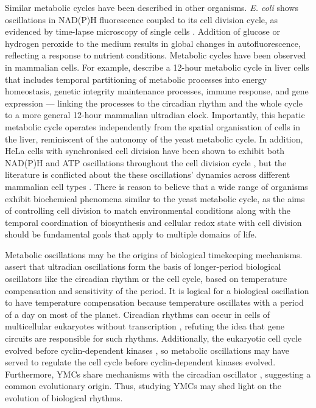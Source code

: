 Similar metabolic cycles have been described in other organisms.
\emph{E. coli} shows oscillations in NAD(P)H fluorescence coupled to its cell division cycle, as evidenced by time-lapse microscopy of single cells \parencite{zhangDynamicSinglecellNAD2018}.
Addition of glucose or hydrogen peroxide to the medium results in global changes in autofluorescence, reflecting a response to nutrient conditions.
Metabolic cycles have been observed in mammalian cells.
For example, \textcite{zhuLogicTemporalCompartmentalization2022} describe a 12-hour metabolic cycle in liver cells that includes temporal partitioning of metabolic processes into energy homeostasis, genetic integrity maintenance processes, immune response, and gene expression --- linking the processes to the circadian rhythm and the whole cycle to a more general 12-hour mammalian ultradian clock.
Importantly, this hepatic metabolic cycle operates independently from the spatial organisation of cells in the liver, reminiscent of the autonomy of the yeast metabolic cycle.
In addition, HeLa cells with synchronised cell division have been shown to exhibit both NAD(P)H and ATP oscillations throughout the cell division cycle \parencite{ahnTemporalFluxomicsReveals2017}, but the literature is conflicted about the these oscillations' dynamics across different mammalian cell types \parencite{zylstraMetabolicDynamicsCell2022}.
There is reason to believe that a wide range of organisms exhibit biochemical phenomena similar to the yeast metabolic cycle, as the aims of controlling cell division to match environmental conditions along with the temporal coordination of biosynthesis and cellular redox state with cell division should be fundamental goals that apply to multiple domains of life.

Metabolic oscillations may be the origins of biological timekeeping mechanisms.
\textcite{lloydRedoxRhythmicityClocks2007} assert that ultradian oscillations form the basis of longer-period biological oscillators like the circadian rhythm or the cell cycle, based on temperature compensation and sensitivity of the period.
It is logical for a biological oscillation to have temperature compensation because temperature oscillates with a period of a day on most of the planet.
Circadian rhythms can occur in cells of multicellular eukaryotes without transcription \parencite{oneillCircadianRhythmsPersist2011}, refuting the idea that gene circuits are responsible for such rhythms.
Additionally, the eukaryotic cell cycle evolved before cyclin-dependent kinases \parencite{papagiannakisAutonomousMetabolicOscillations2017}, so metabolic oscillations may have served to regulate the cell cycle before cyclin-dependent kinases evolved.
Furthermore, YMCs share mechanisms with the circadian oscillator \parencite{caustonMetabolicCyclesYeast2015,arataQuantitativeStudiesCellDivision2019}, suggesting a common evolutionary origin.
Thus, studying YMCs may shed light on the evolution of biological rhythms.

